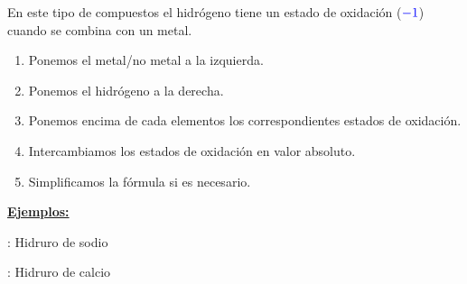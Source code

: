 \documentclass[11pt, a4paper]{article}
\begin{document}
En este tipo de compuestos el hidrógeno tiene un estado de oxidación (${\color{blue}-1}$) cuando se combina con un metal.

\vspace*{2mm}

\begin{enumerate}[label=\itembolascolor{\arabic*}{mygreen}]
    \item Ponemos el metal/no metal a la izquierda.
    \item Ponemos el hidrógeno a la derecha.
    \item Ponemos encima de cada elementos los correspondientes estados de oxidación.
    \item Intercambiamos los estados de oxidación en valor absoluto.
    \item Simplificamos la fórmula si es necesario.
\end{enumerate}

\textbf{\uline{Ejemplos:}}

 : Hidruro de sodio \ch{->}   \ch{->} 

 : Hidruro de calcio \ch{->}   \ch{->} 

\vspace*{2mm}
\end{document}
